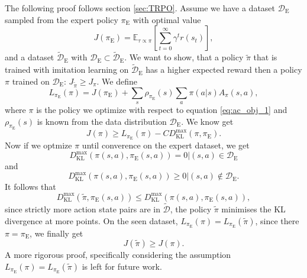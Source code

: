 The following proof follows section \ref{sec:TRPO}. 
Assume we have a dataset $\mathcal{D}_{\text{E}}$ sampled from the expert policy $\pi_{\text{E}}$ with optimal value 
$$J(\pi_{\text{E}}) =\mathbb{E}_{\tau \propto \pi}\left[\sum_{t=0}^{\infty}  \gamma^t r(s_t) \right],$$
and a dataset $\tilde{\mathcal{D}}_{\text{E}}$ with $\mathcal{D}_{\text{E}} \subset \tilde{\mathcal{D}}_{\text{E}}$. 
We want to show, that a policy $\tilde{\pi}$ that is trained with imitation learning on $\tilde{\mathcal{D}}_{\text{E}}$ has 
a higher expected reward then a policy $\pi$ trained on $\mathcal{D}_{\text{E}}$: $J_{\tilde{\pi}} \geq J_{\pi}$.
We define 
$$L_{\pi_{\text{E}}}(\pi) = J(\pi_{\text{E}}) + \sum_s \rho_{\pi_{\text{E}}}(s) \sum_a \pi(a|s) A_{\pi}(s,a),$$
where $\pi$ is the policy we optimize with respect to equation \ref{eq:ac_obj_1} and $\rho_{\pi_{\text{E}}}(s)$ is known from 
the data distribution $\mathcal{D}_{\text{E}}$. We know get 
$$J({\pi}) \geq L_{\pi_{\text{E}}}({\pi}) - C D^{\max}_{\operatorname{KL}} (\pi,\pi_{\text{E}}).$$
Now if we optmize $\pi$ until converence on the expert dataset, we get 
$$D^{\max}_{\operatorname{KL}}(\pi(s,a),\pi_{\text{E}}(s,a)) = 0 |(s,a) \in \mathcal{D}_{\text{E}}$$
and 
$$D^{\max}_{\operatorname{KL}}(\pi(s,a),\pi_{\text{E}}(s,a)) \geq 0 |(s,a) \notin \mathcal{D}_{\text{E}}.$$
It follows that 
$$D^{\max}_{\operatorname{KL}}(\tilde{\pi},\pi_{\text{E}}(s,a)) \leq D^{\max}_{\operatorname{KL}}(\pi(s,a),\pi_{\text{E}}(s,a)),$$
since strictly more action state pairs are in $\tilde{\mathcal{D}}$, the policy $\tilde{\pi}$ minimises the KL divergence at more points.
On the seen dataset, $L_{\pi_{\text{E}}}({\pi}) = L_{\pi_{\text{E}}}({\tilde{\pi}})$, since there $\pi = \pi_{\text{E}}$, we finally get 
\begin{equation}
    J(\tilde{\pi}) \geq J({\pi}).
\end{equation}
A more rigorous proof, specifically considering the assumption $L_{\pi_{\text{E}}}({\pi}) = L_{\pi_{\text{E}}}({\tilde{\pi}})$ is left for future work.\\

